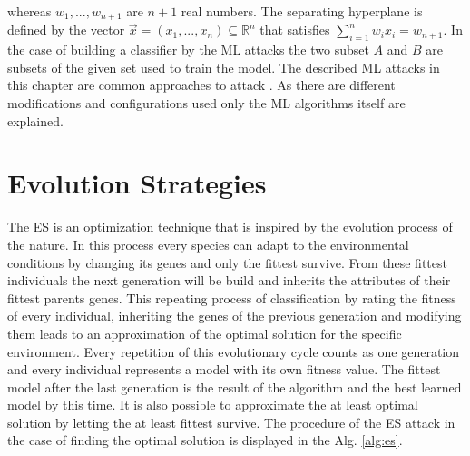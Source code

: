 whereas $w_1, ..., w_{n + 1}$ are $n + 1$ real numbers.
The separating hyperplane is defined by the vector $\vec{x} = (x_1, ..., x_n) \subseteq \mathbb{R}^n$ that satisfies $\sum_{i = 1}^{n} w_i x_i = w_{n + 1}$.%
In the case of building a classifier by the \ac{ML} attacks the two subset $A$ and $B$ are subsets of the given set used to train the model.
The described \ac{ML} attacks in this chapter are common approaches to attack \pufs \cite{Ruhrmair2014PUFOverview}.
As there are different modifications and configurations used only the \ac{ML} algorithms itself are explained.

% 
% 
% 

\section{Evolution Strategies}
\label{sec:evolutionstrategies}

The \acf{ES} is an optimization technique that is inspired by the evolution process of the nature.
In this process every species can adapt to the environmental conditions by changing its genes and only the fittest survive.
From these fittest individuals the next generation will be build and inherits the attributes of their fittest parents genes.
This repeating process of classification by rating the fitness of every individual, inheriting the genes of the previous generation and modifying them leads to an approximation of the optimal solution for the specific environment.
Every repetition of this evolutionary cycle counts as one generation and every individual represents a model with its own fitness value.	%
The fittest model after the last generation is the result of the algorithm and the best learned model by this time.
It is also possible to approximate the at least optimal solution by letting the at least fittest survive.
The procedure of the \ac{ES} attack in the case of finding the optimal solution is displayed in the Alg. \ref{alg:es}.

